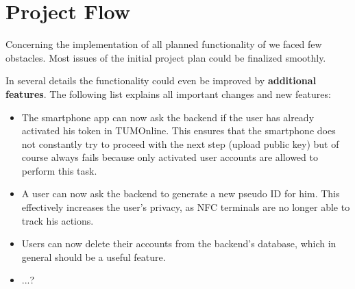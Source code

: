 \section{Project Flow}\label{sec:project_flow}

Concerning the implementation of all planned functionality of \app we faced few obstacles.
Most issues of the initial project plan could be finalized smoothly.

In several details the functionality could even be improved by \textbf{additional features}.
The following list explains all important changes and new features:
\begin{itemize}
\item The smartphone app can now ask the backend if the user has already activated his token in TUMOnline.
This ensures that the smartphone does not constantly try to proceed with the next step (upload public key) but of course always fails because only activated user accounts are allowed to perform this task.
\item A user can now ask the backend to generate a new pseudo ID for him.
This effectively increases the user's privacy, as NFC terminals are no longer able to track his actions.
\item Users can now delete their accounts from the backend's database, which in general should be a useful feature.
\item ...?
\end{itemize}

\bigskip


